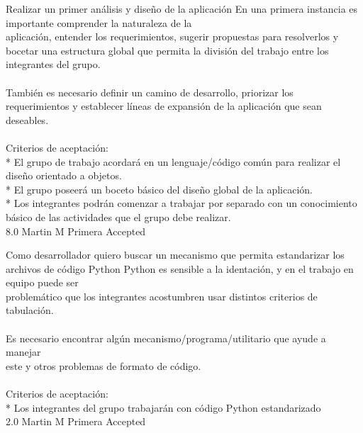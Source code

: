 	{Realizar un primer análisis y diseño de la aplicación} %
	{En una primera instancia es importante comprender la naturaleza de la\\
aplicación, entender los requerimientos, sugerir propuestas para resolverlos y\\
bocetar una estructura global que permita la división del trabajo entre los\\
integrantes del grupo.\\
  \\
También es necesario definir un camino de desarrollo, priorizar los\\
requerimientos y establecer líneas de expansión de la aplicación que sean\\
deseables.\\
  \\
Criterios de aceptación:\\
* El grupo de trabajo acordará en un lenguaje/código común para realizar el diseño orientado a objetos.  \\
* El grupo poseerá un boceto básico del diseño global de la aplicación.  \\
* Los integrantes podrán comenzar a trabajar por separado con un conocimiento básico de las actividades que el grupo debe realizar.  \\
} %
	{} %
	{8.0} %
	{Martin M} %
	{Primera} %
	{Accepted} %


\vspace{20pt}

	{Como desarrollador quiero buscar un mecanismo que permita estandarizar los archivos de código Python} %
	{Python es sensible a la identación, y en el trabajo en equipo puede ser\\
problemático que los integrantes acostumbren usar distintos criterios de\\
tabulación.\\
  \\
Es necesario encontrar algún mecanismo/programa/utilitario que ayude a manejar\\
este y otros problemas de formato de código.\\
  \\
Criterios de aceptación:\\
* Los integrantes del grupo trabajarán con código Python estandarizado  \\
} %
	{} %
	{2.0} %
	{Martin M} %
	{Primera} %
	{Accepted} %


